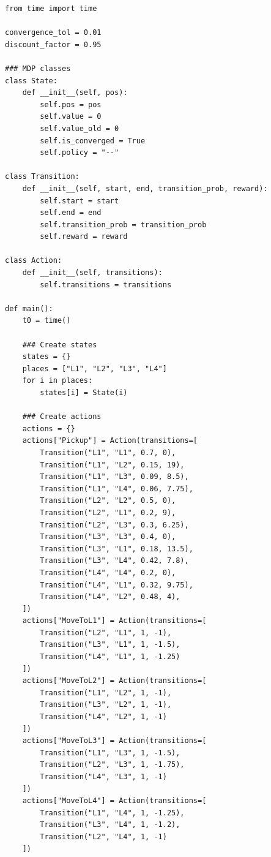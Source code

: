 \documentclass[conference]{styles/acmsiggraph}
\begin{document}
\begin{lstlisting}[caption={Core Code of Value Iteration}, label={lst:q6}]
from time import time

convergence_tol = 0.01
discount_factor = 0.95

### MDP classes
class State:
	def __init__(self, pos):
		self.pos = pos
		self.value = 0
		self.value_old = 0
		self.is_converged = True
		self.policy = "--"

class Transition:
	def __init__(self, start, end, transition_prob, reward):
		self.start = start
		self.end = end
		self.transition_prob = transition_prob
		self.reward = reward

class Action:
	def __init__(self, transitions):
		self.transitions = transitions

def main():
	t0 = time()

	### Create states
	states = {}
	places = ["L1", "L2", "L3", "L4"]
	for i in places:
		states[i] = State(i)

	### Create actions
	actions = {}
	actions["Pickup"] = Action(transitions=[
		Transition("L1", "L1", 0.7, 0),
		Transition("L1", "L2", 0.15, 19),
		Transition("L1", "L3", 0.09, 8.5),
		Transition("L1", "L4", 0.06, 7.75),
		Transition("L2", "L2", 0.5, 0),
		Transition("L2", "L1", 0.2, 9),
		Transition("L2", "L3", 0.3, 6.25),
		Transition("L3", "L3", 0.4, 0),
		Transition("L3", "L1", 0.18, 13.5),
		Transition("L3", "L4", 0.42, 7.8),
		Transition("L4", "L4", 0.2, 0),
		Transition("L4", "L1", 0.32, 9.75),
		Transition("L4", "L2", 0.48, 4),
	])
	actions["MoveToL1"] = Action(transitions=[
		Transition("L2", "L1", 1, -1),
		Transition("L3", "L1", 1, -1.5),
		Transition("L4", "L1", 1, -1.25)
	])
	actions["MoveToL2"] = Action(transitions=[
		Transition("L1", "L2", 1, -1),
		Transition("L3", "L2", 1, -1),
		Transition("L4", "L2", 1, -1)
	])
	actions["MoveToL3"] = Action(transitions=[
		Transition("L1", "L3", 1, -1.5),
		Transition("L2", "L3", 1, -1.75),
		Transition("L4", "L3", 1, -1)
	])
	actions["MoveToL4"] = Action(transitions=[
		Transition("L1", "L4", 1, -1.25),
		Transition("L3", "L4", 1, -1.2),
		Transition("L2", "L4", 1, -1)
	])


\end{lstlisting}
\end{document}
